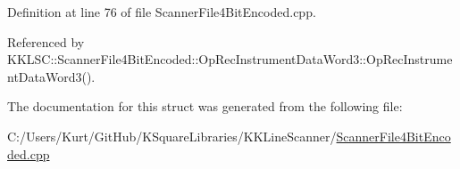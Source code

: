 Definition at line 76 of file Scanner\+File4\+Bit\+Encoded.\+cpp.



Referenced by K\+K\+L\+S\+C\+::\+Scanner\+File4\+Bit\+Encoded\+::\+Op\+Rec\+Instrument\+Data\+Word3\+::\+Op\+Rec\+Instrument\+Data\+Word3().



The documentation for this struct was generated from the following file\+:\begin{DoxyCompactItemize}
\item 
C\+:/\+Users/\+Kurt/\+Git\+Hub/\+K\+Square\+Libraries/\+K\+K\+Line\+Scanner/\hyperlink{_scanner_file4_bit_encoded_8cpp}{Scanner\+File4\+Bit\+Encoded.\+cpp}\end{DoxyCompactItemize}
